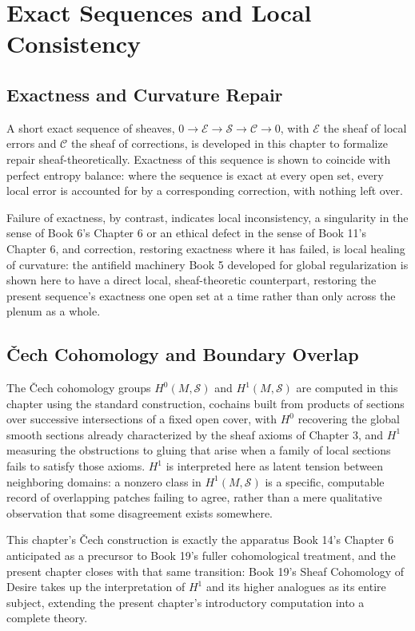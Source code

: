 \part{Exact Sequences and Local Consistency}

\chapter{Exactness and Curvature Repair}

A short exact sequence of sheaves, $0 \to \mathcal{E} \to \mathcal{S} \to \mathcal{C} \to 0$, with $\mathcal{E}$ the sheaf of local errors and $\mathcal{C}$ the sheaf of corrections, is developed in this chapter to formalize repair sheaf-theoretically. Exactness of this sequence is shown to coincide with perfect entropy balance: where the sequence is exact at every open set, every local error is accounted for by a corresponding correction, with nothing left over.

Failure of exactness, by contrast, indicates local inconsistency, a singularity in the sense of Book 6's Chapter 6 or an ethical defect in the sense of Book 11's Chapter 6, and correction, restoring exactness where it has failed, is local healing of curvature: the antifield machinery Book 5 developed for global regularization is shown here to have a direct local, sheaf-theoretic counterpart, restoring the present sequence's exactness one open set at a time rather than only across the plenum as a whole.

\chapter{Čech Cohomology and Boundary Overlap}

The Čech cohomology groups $H^0(M, \mathcal{S})$ and $H^1(M, \mathcal{S})$ are computed in this chapter using the standard construction, cochains built from products of sections over successive intersections of a fixed open cover, with $H^0$ recovering the global smooth sections already characterized by the sheaf axioms of Chapter 3, and $H^1$ measuring the obstructions to gluing that arise when a family of local sections fails to satisfy those axioms. $H^1$ is interpreted here as latent tension between neighboring domains: a nonzero class in $H^1(M, \mathcal{S})$ is a specific, computable record of overlapping patches failing to agree, rather than a mere qualitative observation that some disagreement exists somewhere.

This chapter's Čech construction is exactly the apparatus Book 14's Chapter 6 anticipated as a precursor to Book 19's fuller cohomological treatment, and the present chapter closes with that same transition: Book 19's Sheaf Cohomology of Desire takes up the interpretation of $H^1$ and its higher analogues as its entire subject, extending the present chapter's introductory computation into a complete theory.

